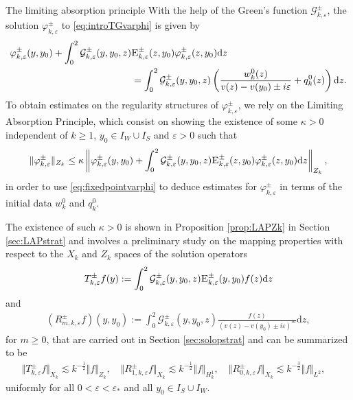 \documentclass[11pt,reqno]{amsproc}
\makeatletter
\renewcommand\subsection{\@startsection{subsection}{2}%
\normalparindent{.5\linespacing\@plus.7\linespacing}{-.5em}
{\normalfont\bfseries}}
\theoremstyle{definition}
\numberwithin{equation}{section}
\newcommand{\scE}{{\textsc{E}}}
\newcommand{\G}{{\mathcal{G}}}
\renewcommand{\d}{\mathrm{d}}
\newcommand{\ep}{\varepsilon}
\makeatother
\begin{document}
\subsection{The limiting absorption principle}
With the help of the Green's function $\G_{k,\ep}^\pm$, the solution $\varphi_{k,\ep
}^\pm$ to \eqref{eq:introTGvarphi} is given by
\begin{equation}\label{eq:fixedpointvarphi}
\begin{split}
\varphi_{k,\ep}^\pm(y,y_0) + \int_0^2 \G_{k,\ep}^\pm(y,y_0,z) &\scE_{k,\ep}^\pm(z,y_0)\varphi_{k,\ep}^\pm(z,y_0) \d z  \\
&= \int_0^2 \G_{k,\ep}^\pm(y,y_0,z) \left( \frac{w_k^0(z)}{v(z) - v(y_0) \pm i\ep} + q_k^0(z) \right) \d z.
\end{split}
\end{equation}
To obtain estimates on the regularity structures of $\varphi_{k,\ep}^\pm$, we rely on the Limiting Absorption Principle, which consist on showing the existence of some $\kappa>0$ independent of $k\geq 1$, $y_0\in I_W\cup I_S$ and $\ep>0$ such that  
\begin{align}\label{eq:coercivitykappa}
\Vert \varphi_{k,\ep}^\pm \Vert_{Z_k} \leq \kappa \left \Vert \varphi_{k,\ep}^\pm(y,y_0) + \int_0^2 \G_{k,\ep}^\pm(y,y_0,z)  \scE_{k,\ep}^\pm(z,y_0)\varphi_{k,\ep}^\pm(z,y_0) \d z \right \Vert_{Z_k},
\end{align}
in order to use \eqref{eq:fixedpointvarphi} to deduce estimates for $\varphi_{k,\ep}^\pm$ in terms of the initial data $w_k^0$ and $q_k^0$. 

The existence of such $\kappa>0$ is shown in Proposition \ref{prop:LAPZk} in Section \ref{sec:LAPstrat} and involves a preliminary study on the mapping properties with respect to the $X_k$ and $Z_k$ spaces of the solution operators 
\begin{align}\label{eq:introdefsolopT}
T_{k,\ep}^\pm f(y) := \int_{0} ^{2} \G_{k,\ep}^\pm(y,y_0,z)\scE_{k,\ep}^\pm(y,y_0) f(z) \d z
\end{align}
and 
\begin{align}\label{eq:introdefsolopR}
(R_{m,k,\ep}^\pm f)(y,y_0) := \int_0^2\G_{k,\ep}^\pm(y,y_0,z)\frac{f(z)}{(v(z)-v(y_0)\pm i\ep)^m} \d z,
\end{align}
for $m\geq 0$, that are carried out in Section \ref{sec:solopstrat} and can be summarized to be
\begin{align}\label{eq:introXkestimatesTR}
\Vert T_{k,\ep}^\pm f \Vert_{X_k}\lesssim k^{-\frac12}\Vert f \Vert_{Z_k}, \quad \Vert R_{1,k,\ep}^\pm f \Vert_{X_k}\lesssim k^{-\frac12}\Vert f \Vert_{H_k^1}, \quad  \Vert R_{0,k,\ep}^\pm f \Vert_{X_k}\lesssim k^{-\frac32}\Vert f \Vert_{L^2}, \quad 
\end{align}
uniformly for all $0<\ep<\ep_*$ and all $y_0\in I_S\cup I_W$. 
\end{document}
